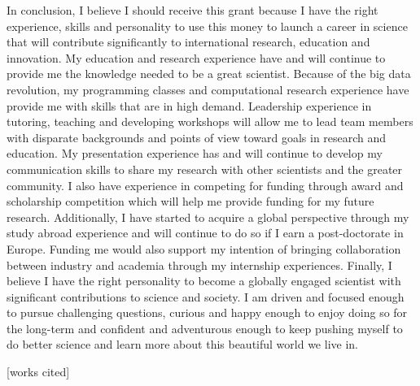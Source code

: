 \documentclass[12pt]{amsart}
\begin{document}
In conclusion, I believe I should receive this grant because I have the right experience, skills and personality to use this money to launch a career in science that will contribute significantly to international research, education and innovation.  
My education and research experience have and will continue to provide me the knowledge needed to be a great scientist.  
Because of the big data revolution, my programming classes and computational research experience have provide me with skills that are in high demand.
Leadership experience in tutoring, teaching and developing workshops will allow me to lead team members with disparate backgrounds and points of view toward goals in research and education.
My presentation experience has and will continue to develop my communication skills to share my research with other scientists and the greater community.
I also have experience in competing for funding through award and scholarship competition which will help me provide funding for my future research.  
Additionally, I have started to acquire a global perspective through my study abroad experience and will continue to do so if I earn a post-doctorate in Europe.  
Funding me would also support my intention of bringing collaboration between industry and academia through my internship experiences.
Finally, I believe I have the right personality to become a globally engaged scientist with significant contributions to science and society.  
I am driven and focused enough to pursue challenging questions, curious and happy enough to enjoy doing so for the long-term and confident and adventurous enough to keep pushing myself to do better science and learn more about this beautiful world we live in.

\small{
[works cited]
}
\end{document}
